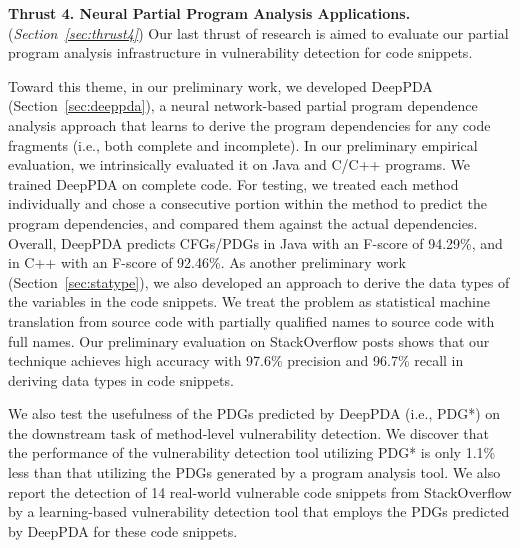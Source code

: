 \vspace{3pt}
\noindent \textbf{Thrust 4. Neural Partial Program Analysis
  Applications.}  ({\em Section~\ref{sec:thrust4}}) Our last thrust of
research is aimed to evaluate our partial program analysis
infrastructure in vulnerability detection for code snippets.





Toward this theme, in our preliminary work, we developed DeepPDA
(Section~\ref{sec:deeppda}), a neural network-based partial program
dependence analysis approach that learns to derive the program
dependencies for any code fragments (i.e., both complete and
incomplete). In our preliminary empirical evaluation, we intrinsically
evaluated it on Java and C/C++ programs. We trained DeepPDA on
complete code. For testing, we treated each method individually and
chose a consecutive portion within the method to predict the program
dependencies, and compared them against the actual
dependencies. Overall, DeepPDA predicts CFGs/PDGs in Java with
an F-score of 94.29\%, and in C++ with an F-score of 92.46\%. As
another preliminary work (Section~\ref{sec:statype}), we also
developed an approach to derive the data types of the variables in the
code snippets. We treat the problem as statistical machine translation
from source code with partially qualified names to source code with
full names. Our preliminary evaluation on StackOverflow posts shows
that our technique achieves high accuracy with 97.6\% precision and
96.7\% recall in deriving data types in code snippets.

We also test the usefulness of the PDGs predicted by DeepPDA (i.e.,
PDG*) on the downstream task of method-level vulnerability
detection. We discover that the performance of the vulnerability
detection tool utilizing PDG* is only 1.1\% less than that utilizing
the PDGs generated by a program analysis tool.
We also report the detection of 14 real-world vulnerable code snippets
from StackOverflow by a learning-based vulnerability detection
tool that employs the PDGs predicted by DeepPDA for these code snippets.


